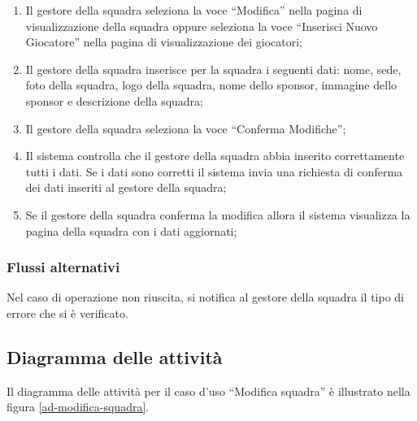 \begin{enumerate}
	
	\item
	Il gestore della squadra seleziona la voce ``Modifica'' nella pagina di visualizzazione della squadra oppure seleziona la voce ``Inserisci Nuovo Giocatore'' nella pagina di visualizzazione dei giocatori;
	
	\item
	Il gestore della squadra inserisce per la squadra i seguenti dati: nome, sede, foto della squadra, logo della squadra, nome dello sponsor, immagine dello sponsor e descrizione della squadra;
	
	\item
	Il gestore della squadra seleziona la voce ``Conferma Modifiche'';
	
	\item
	Il sistema controlla che il gestore della squadra abbia inserito correttamente tutti i dati. Se i dati sono corretti il sistema invia una richiesta di conferma dei dati inseriti al gestore della squadra;
	
	\item
	Se il gestore della squadra conferma la modifica allora il sistema visualizza la pagina della squadra con i dati aggiornati;
	
\end{enumerate}

\subsubsection*{Flussi alternativi}
Nel caso di operazione non riuscita, si notifica al gestore della squadra il tipo di errore che si è verificato.

\subsection*{Diagramma delle attività}
Il diagramma delle attività per il caso d'uso ``Modifica squadra'' è illustrato nella figura \vref{ad-modifica-squadra}.

